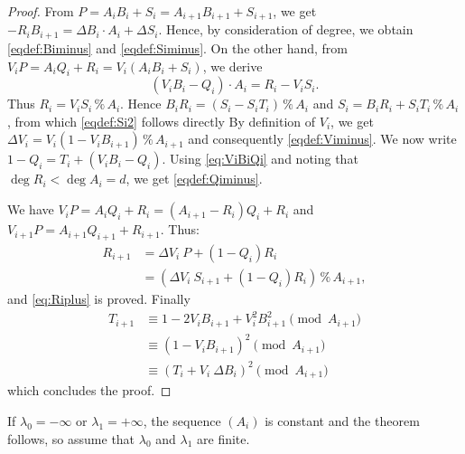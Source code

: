 \documentclass{sig-alternate-05-2015}
\renewcommand{\mod}{\,\%\,}
\begin{document}
\begin{proof}
From $P= A_i B_i + S_i= A_{i+1} B_{i+1} + S_{i+1}$, we get
$- R_i B_{i+1}= \Delta B_i \cdot A_i + \Delta S_i$.
Hence, by consideration of degree, we obtain \eqref{eqdef:Biminus} 
and \eqref{eqdef:Siminus}.
On the other hand, from $V_i P = A_i Q_i + R_i=V_i (A_i B_i + S_i)$, we 
derive
\begin{equation}
\label{eq:ViBiQi} 
(V_i B_i -Q_i) \cdot A_i=R_i-V_i S_i. 
\end{equation} 
Thus $R_i=V_i S_i \mod A_i$.
Hence $B_i R_i = (S_i - S_i T_i) \mod A_i$ and $S_i = B_i R_i + S_i T_i 
\mod A_i$, from which \eqref{eqdef:Si2} follows directly 
By definition of $V_i$, we get $\Delta V_i = V_i (1-V_i B_{i+1}) \mod A_{i+1}$ and consequently \eqref{eqdef:Viminus}.
We now write $1-Q_i= T_i + (V_i B_i - Q_i)$. Using \eqref{eq:ViBiQi} and
noting that $\deg R_i < \deg A_i = d$, we 
get \eqref{eqdef:Qiminus}.

We have $V_i P=A_i Q_i+R_i=(A_{i+1}-R_i)Q_i+R_i$ and $V_{i+1} P=A_{i+1} 
Q_{i+1}+R_{i+1}$. Thus:
\begin{align*}
R_{i+1} &= \Delta V_i \: P + (1-Q_i)R_i \\
 &= (\Delta V_i \: S_{i+1} + (1-Q_i)R_i) \mod A_{i+1},
\end{align*} 
and \eqref{eq:Riplus} is proved. Finally
\begin{align*}
T_{i+1} &\equiv 1-2V_i B_{i+1}+V_i^2 B_{i+1}^2 \pmod {A_{i+1}} \\
&\equiv (1-V_i B_{i+1})^2 \pmod {A_{i+1}} \\
&\equiv (T_i + V_i \: \Delta B_i)^2 \pmod {A_{i+1}}
\end{align*}
which concludes the proof.
\end{proof}

If $\lambda_0 = -\infty$ or $\lambda_1 = +\infty$, the sequence $(A_i)$
is constant and the theorem follows, so assume that $\lambda_0$
and $\lambda_1$ are finite.
\end{document}
